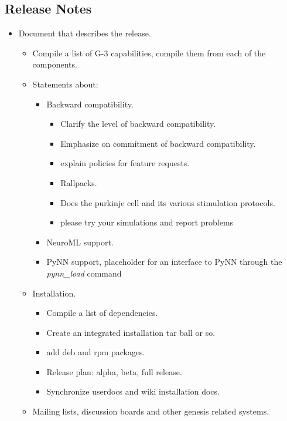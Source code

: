 \documentclass[12pt]{article}
\begin{document}
\subsection{Release Notes}

\begin{itemize}
\item Document that describes the release.
  \begin{itemize}
  \item Compile a list of G-3 capabilities, compile them from each of the components.
  \item Statements about:
    \begin{itemize}
    \item Backward compatibility.
      \begin{itemize}
      \item Clarify the level of backward compatibility. 
      \item Emphasize on commitment of backward compatibility.
      \item explain policies for feature requests.
      \item Rallpacks.
      \item Does the purkinje cell and its various stimulation protocols.
      \item please try your simulations and report problems
      \end{itemize}
    \item NeuroML support.
    \item PyNN support, placeholder for an interface to PyNN through the
      {\it pynn\_load} command
    \end{itemize}
  \item Installation.
    \begin{itemize}
    \item Compile a list of dependencies.
    \item Create an integrated installation tar ball or so.
    \item add deb and rpm packages.
    \item Release plan: alpha, beta, full release.
    \item Synchronize userdocs and wiki installation docs.
    \end{itemize}
  \item Mailing lists, discussion boards and other genesis related systems.
    \begin{itemize}

\end{itemize}
\end{itemize}
\end{itemize}
\end{document}
